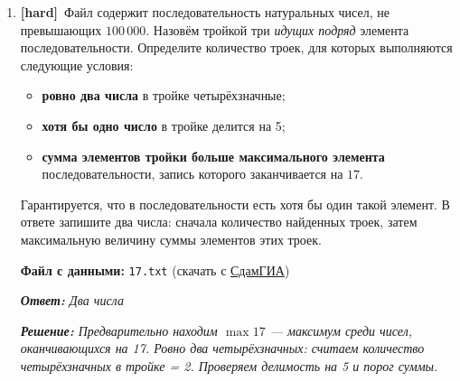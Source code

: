 \documentclass[a4paper]{article}
\newcommand{\hardtag}{\textcolor{hardcolor}{\textbf{[hard]}}}
\newcommand{\answer}[1]{\par\smallskip\textit{\textbf{Ответ:} #1}}
\newcommand{\solution}[1]{\par\textit{\textbf{Решение:} #1}}
\newcommand{\filehint}[1]{\par\smallskip\textbf{Файл с данными:} \texttt{#1} (скачать с \href{https://inf-ege.sdamgia.ru/}{СдамГИА})}
\begin{document}
\begin{enumerate}[label=\textbf{Задача \arabic*.}, leftmargin=*, itemsep=10mm]
  \bigskip

  \item %
  \hardtag\ Файл содержит последовательность натуральных чисел, не превышающих $100\,000$.
  Назовём тройкой три \emph{идущих подряд} элемента последовательности.
  Определите количество троек, для которых выполняются следующие условия:
  \begin{itemize}
    \item \textbf{ровно два числа} в тройке четырёхзначные;
    \item \textbf{хотя бы одно число} в тройке делится на 5;
    \item \textbf{сумма элементов тройки больше максимального элемента}
    последовательности, запись которого заканчивается на $17$.
  \end{itemize}
  Гарантируется, что в последовательности есть хотя бы один такой элемент.
  В ответе запишите два числа: сначала количество найденных троек, затем
  максимальную величину суммы элементов этих троек.
  \filehint{17.txt}
  \answer{Два числа}
  \solution{Предварительно находим $\max17$ — максимум среди чисел, оканчивающихся на 17. Ровно два четырёхзначных: считаем количество четырёхзначных в тройке = 2. Проверяем делимость на 5 и порог суммы.}

\end{enumerate}
\end{document}
